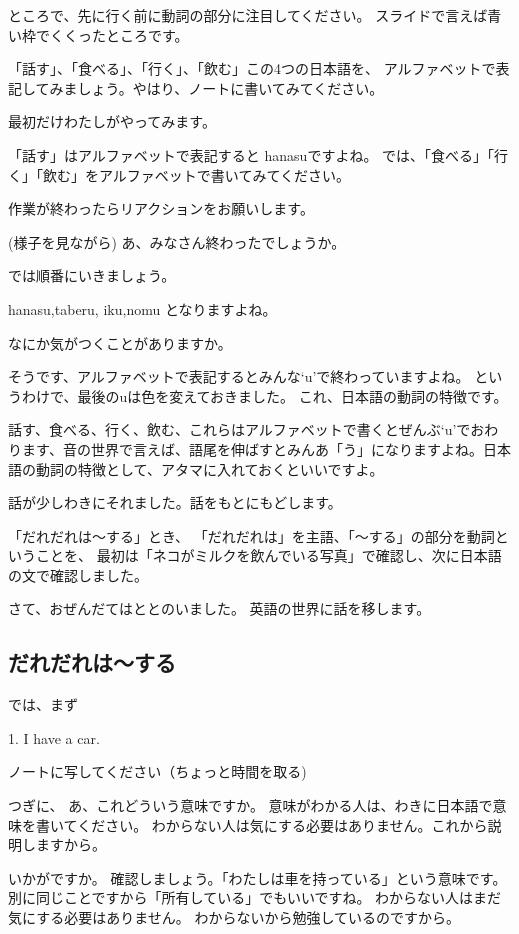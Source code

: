 \documentclass[12pt]{jlreq}
\begin{document}
ところで、先に行く前に動詞の部分に注目してください。
スライドで言えば青い枠でくくったところです。

「話す」、「食べる」、「行く」、「飲む」この4つの日本語を、
アルファベットで表記してみましょう。やはり、ノートに書いてみてください。

最初だけわたしがやってみます。

「話す」はアルファベットで表記すると
\ComputerMouse{}hanasuですよね。
では、「食べる」「行く」「飲む」をアルファベットで書いてみてください。

作業が終わったらリアクションをお願いします。

(様子を見ながら)
あ、みなさん終わったでしょうか。

では順番にいきましょう。

hanasu,taberu,
iku,nomu
となりますよね。

なにか気がつくことがありますか。

そうです、アルファベットで表記するとみんな`u'で終わっていますよね。
というわけで、最後のuは色を変えておきました。
これ、日本語の動詞の特徴です。

話す、食べる、行く、飲む、これらはアルファベットで書くとぜんぶ`u'でおわります、音の世界で言えば、語尾を伸ばすとみんあ「う」になりますよね。日本語の動詞の特徴として、アタマに入れておくといいですよ。

話が少しわきにそれました。話をもとにもどします。

「だれだれは〜する」とき、
「だれだれは」を主語、「〜する」の部分を動詞ということを、
最初は「ネコがミルクを飲んでいる写真」で確認し、次に日本語の文で確認しました。

さて、おぜんだてはととのいました。
英語の世界に話を移します。

{\large \ComputerMouse}
\subsection{だれだれは〜する}
では、まず

1. I have a car.

ノートに写してください（ちょっと時間を取る)

つぎに、
あ、これどういう意味ですか。
意味がわかる人は、わきに日本語で意味を書いてください。
わからない人は気にする必要はありません。これから説明しますから。

いかがですか。
確認しましょう。{\large \ComputerMouse}「わたしは車を持っている」という意味です。別に同じことですから「所有している」でもいいですね。
わからない人はまだ気にする必要はありません。
わからないから勉強しているのですから。
\end{document}

